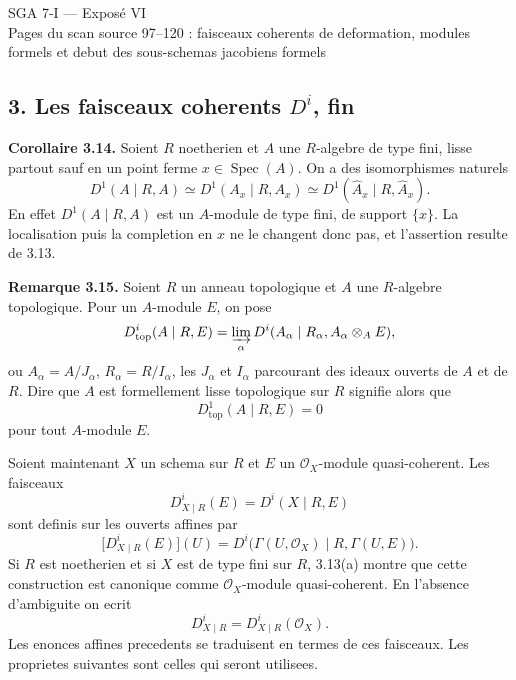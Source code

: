 \documentclass[11pt]{article}
\providecommand{\Spec}{\operatorname{Spec}}
\providecommand{\Aut}{\operatorname{Aut}}
\providecommand{\Spf}{\operatorname{Spf}}
\begin{document}
\providecommand{\Sing}{\operatorname{Sing}}
\providecommand{\Supp}{\operatorname{Supp}}
\providecommand{\depth}{\operatorname{depth}}
\providecommand{\Fitt}{\operatorname{Fitt}}
\providecommand{\Jac}{\operatorname{Jac}}
\providecommand{\sHom}{\mathcal Hom}
\providecommand{\RHom}{\operatorname{RHom}}
\providecommand{\Aut}{\operatorname{Aut}}
\providecommand{\Der}{\operatorname{Der}}
\providecommand{\Spf}{\operatorname{Spf}}
\providecommand{\cM}{\mathcal M}
\providecommand{\cB}{\mathcal B}
\providecommand{\cJ}{\mathcal J}
\providecommand{\cI}{\mathcal I}
\providecommand{\cL}{\mathcal L}
\providecommand{\cR}{\mathcal R}
\providecommand{\cT}{\mathcal T}
\providecommand{\cU}{\mathcal U}
\providecommand{\cV}{\mathcal V}
\providecommand{\kdual}{k[\varepsilon]}


\begin{center}
{\Large SGA 7-I — Exposé VI}\\[0.3em]
{\large Pages du scan source 97--120 : faisceaux coherents de deformation, modules formels et debut des sous-schemas jacobiens formels}
\end{center}

\subsection*{3. Les faisceaux coherents \(D^i\), fin}

\textbf{Corollaire 3.14.} Soient \(R\) noetherien et \(A\) une \(R\)-algebre de type fini, lisse partout sauf en un point ferme \(x\in\Spec(A)\). On a des isomorphismes naturels
\[
 D^1(A\mid R,A)\simeq D^1(A_x\mid R,A_x)
 \simeq D^1(\widehat A_x\mid R,\widehat A_x).
\]
En effet \(D^1(A\mid R,A)\) est un \(A\)-module de type fini, de support \(\{x\}\). La localisation puis la completion en \(x\) ne le changent donc pas, et l'assertion resulte de 3.13.

\textbf{Remarque 3.15.} Soient \(R\) un anneau topologique et \(A\) une \(R\)-algebre topologique. Pour un \(A\)-module \(E\), on pose
\[
 D^i_{\mathrm{top}}(A\mid R,E)=
 \varinjlim_{\alpha} D^i(A_\alpha\mid R_\alpha, A_\alpha\otimes_A E),
\]
ou \(A_\alpha=A/J_\alpha\), \(R_\alpha=R/I_\alpha\), les \(J_\alpha\) et \(I_\alpha\) parcourant des ideaux ouverts de \(A\) et de \(R\). Dire que \(A\) est formellement lisse topologique sur \(R\) signifie alors que
\[
 D^1_{\mathrm{top}}(A\mid R,E)=0
\]
pour tout \(A\)-module \(E\).

Soient maintenant \(X\) un schema sur \(R\) et \(E\) un \(\mathcal O_X\)-module quasi-coherent. Les faisceaux
\[
 D^i_{X\mid R}(E)=D^i(X\mid R,E)
\]
sont definis sur les ouverts affines par
\[
 \bigl[D^i_{X\mid R}(E)\bigr](U)=
 D^i\bigl(\Gamma(U,\mathcal O_X)\mid R,\Gamma(U,E)\bigr).
\]
Si \(R\) est noetherien et si \(X\) est de type fini sur \(R\), 3.13(a) montre que cette construction est canonique comme \(\mathcal O_X\)-module quasi-coherent. En l'absence d'ambiguite on ecrit
\[
 D^i_{X\mid R}=D^i_{X\mid R}(\mathcal O_X).
\]
Les enonces affines precedents se traduisent en termes de ces faisceaux. Les proprietes suivantes sont celles qui seront utilisees.
\end{document}

